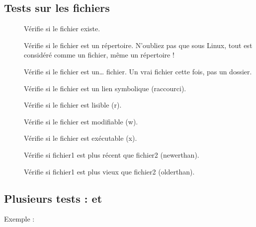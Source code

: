 \documentclass[letterpaper,10pt,french]{sphinxmanual}
\begin{document}
\subsection{Tests sur les fichiers}
\label{\detokenize{21-scripts-shell:tests-sur-les-fichiers}}\begin{description}
\item[{}] \leavevmode
Vérifie si le fichier existe.

\item[{}] \leavevmode
Vérifie si le fichier est un répertoire. N’oubliez pas que sous Linux, tout est considéré comme un fichier, même un répertoire !

\item[{}] \leavevmode
Vérifie si le fichier est un… fichier. Un vrai fichier cette fois, pas un dossier.

\item[{}] \leavevmode
Vérifie si le fichier est un lien symbolique (raccourci).

\item[{}] \leavevmode
Vérifie si le fichier est lisible (r).

\item[{}] \leavevmode
Vérifie si le fichier est modifiable (w).

\item[{}] \leavevmode
Vérifie si le fichier est exécutable (x).

\item[{}] \leavevmode
Vérifie si fichier1 est plus récent que fichier2 (newerthan).

\item[{}] \leavevmode
Vérifie si fichier1 est plus vieux que fichier2 (olderthan).

\end{description}


\subsection{Plusieurs tests : \sphinxstyleliteralintitle{\sphinxupquote{\&\&}} et \sphinxstyleliteralintitle{\sphinxupquote{\textbar{}\textbar{}}}}
\label{\detokenize{21-scripts-shell:plusieurs-tests-et}}
Exemple :
\end{document}
